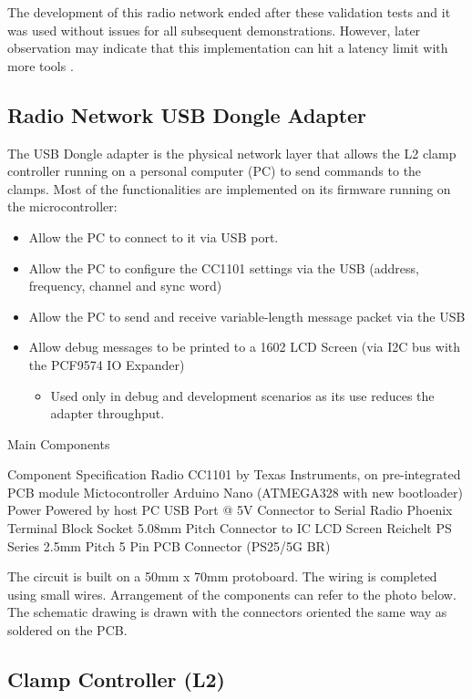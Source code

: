 The development of this radio network ended after these validation tests and it was used without issues for all subsequent demonstrations. However, later observation may indicate that this implementation can hit a latency limit with more tools .

\subsection{Radio Network USB Dongle Adapter}
\label{subsection:exploration-2-radio-network-usb-dongle-adapter}

The USB Dongle adapter is the physical network layer that allows the L2 clamp controller running on a personal computer (PC) to send commands to the clamps. Most of the functionalities are implemented on its firmware running on the microcontroller:
\begin{itemize}
    \item Allow the PC to connect to it via USB port.
    \item Allow the PC to configure the CC1101 settings via the USB (address, frequency, channel and sync word)
    \item Allow the PC to send and receive variable-length message packet via the USB
    \item Allow debug messages to be printed to a 1602 LCD Screen (via I2C bus with the PCF9574 IO Expander)
    \begin{itemize}
        \item Used only in debug and development scenarios as its use reduces the adapter throughput.
    \end{itemize}
\end{itemize}

Main Components

Component
Specification
Radio
CC1101 by Texas Instruments, on pre-integrated PCB module
Mictocontroller
Arduino Nano (ATMEGA328 with new bootloader)
Power
Powered by host PC USB Port @ 5V
Connector to Serial Radio
Phoenix Terminal Block Socket 5.08mm Pitch
Connector to IC LCD Screen
Reichelt PS Series 2.5mm Pitch 5 Pin PCB Connector (PS25/5G BR)  


The circuit is built on a 50mm x 70mm protoboard. The wiring is completed using small wires. Arrangement of the components can refer to the photo below. The schematic drawing is drawn with the connectors oriented the same way as soldered on the PCB.

\subsection{Clamp Controller (L2)}
\label{subsection:exploration-2-clamp-controller-l2}


